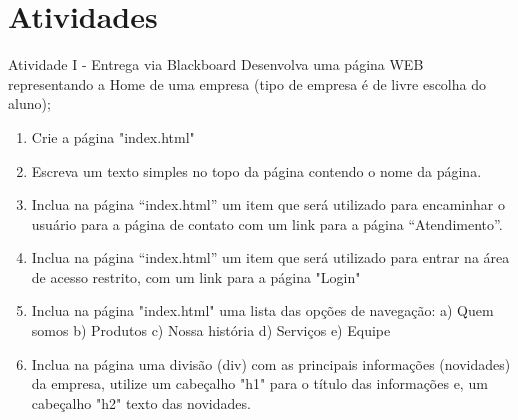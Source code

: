 \documentclass{beamer}
\begin{document}
\section{Atividades}
\begin{frame}{Atividade I - Entrega via Blackboard}
\small
Desenvolva uma página WEB representando a Home de uma empresa (tipo de empresa é de livre escolha do aluno);

\begin{enumerate}
 \item Crie a página "index.html"
  \item Escreva um texto simples no topo da página contendo o nome da página.
  \item Inclua na página “index.html” um item que será utilizado para encaminhar o usuário para a página de contato com um link para a página “Atendimento”. 
  \item Inclua na página “index.html” um item que será utilizado para 
entrar na área de acesso restrito, com um link para a página "Login"
  \item Inclua na página "index.html" uma lista das opções de navegação: a) Quem somos b) Produtos c) Nossa história d) Serviços e) Equipe 
  \item Inclua na página uma divisão (div) com as principais informações (novidades) da empresa, utilize um cabeçalho "h1" para o título das informações e, um cabeçalho "h2" texto das novidades.
\end{enumerate}

\end{frame}
\end{document}
